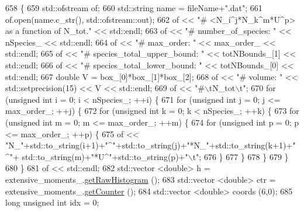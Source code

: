 \begin{DoxyCode}
658                                                                                \{
659     std::ofstream of;
660     std::string name = fileName+\textcolor{stringliteral}{".dat"};
661     of.open(name.c\_str(), std::ofstream::out);
662     of << \textcolor{stringliteral}{"# <N\_i^j*N\_k^m*U^p> as a function of N\_tot."} << std::endl;
663     of << \textcolor{stringliteral}{"# number\_of\_species: "} << nSpecies\_ << std::endl;
664     of << \textcolor{stringliteral}{"# max\_order: "} << max\_order\_ << std::endl;
665     of << \textcolor{stringliteral}{"# species\_total\_upper\_bound: "} << totNBounds\_[1] << std::endl;
666     of << \textcolor{stringliteral}{"# species\_total\_lower\_bound: "} << totNBounds\_[0] << std::endl;
667     \textcolor{keywordtype}{double} V = box\_[0]*box\_[1]*box\_[2];
668     of << \textcolor{stringliteral}{"# volume: "} << std::setprecision(15) << V << std::endl;
669     of << \textcolor{stringliteral}{"#\(\backslash\)tN\_tot\(\backslash\)t"};
670     \textcolor{keywordflow}{for} (\textcolor{keywordtype}{unsigned} \textcolor{keywordtype}{int} i = 0; i < nSpecies\_; ++i) \{
671         \textcolor{keywordflow}{for} (\textcolor{keywordtype}{unsigned} \textcolor{keywordtype}{int} j = 0; j <= max\_order\_; ++j) \{
672             \textcolor{keywordflow}{for} (\textcolor{keywordtype}{unsigned} \textcolor{keywordtype}{int} k = 0; k < nSpecies\_; ++k) \{
673                 \textcolor{keywordflow}{for} (\textcolor{keywordtype}{unsigned} \textcolor{keywordtype}{int} m = 0; m <= max\_order\_; ++m) \{
674                     \textcolor{keywordflow}{for} (\textcolor{keywordtype}{unsigned} \textcolor{keywordtype}{int} p = 0; p <= max\_order\_; ++p) \{
675                         of << \textcolor{stringliteral}{"N\_"}+std::to\_string(i+1)+\textcolor{stringliteral}{"^"}+std::to\_string(j)+\textcolor{stringliteral}{"*N\_"}+std::to\_string(k+1)+\textcolor{stringliteral}{"^"}+
      std::to\_string(m)+\textcolor{stringliteral}{"*U^"}+std::to\_string(p)+\textcolor{stringliteral}{"\(\backslash\)t"};
676                     \}
677                 \}
678             \}
679         \}
680     \}
681     of << std::endl;
682     std::vector <double> h = extensive\_moments\_.\hyperlink{classhistogram_a3a75adbce72057f3a4db805d9efc3c9c}{getRawHistogram} ();
683     std::vector <double> ctr = extensive\_moments\_.\hyperlink{classhistogram_a8417c827c4653055b370786916c901cf}{getCounter} ();
684     std::vector <double> coords (6,0);
685     \textcolor{keywordtype}{long} \textcolor{keywordtype}{unsigned} \textcolor{keywordtype}{int} idx = 0;

\end{DoxyCode}
